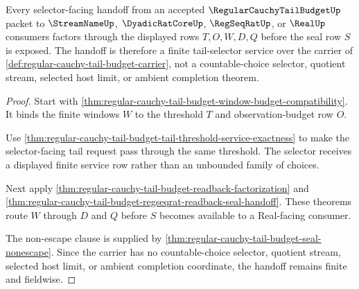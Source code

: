\begin{theorem}
\label{thm:regular-cauchy-tail-budget-tail-selector-handoff}
Every selector-facing handoff from an accepted $\RegularCauchyTailBudgetUp$ packet to $\StreamNameUp$, $\DyadicRatCoreUp$, $\RegSeqRatUp$, or $\RealUp$ consumers factors through the displayed rows $T,O,W,D,Q$ before the seal row $S$ is exposed. The handoff is therefore a finite tail-selector service over the carrier of \autoref{def:regular-cauchy-tail-budget-carrier}, not a countable-choice selector, quotient stream, selected host limit, or ambient completion theorem.
\end{theorem}
\begin{proof}
Start with \autoref{thm:regular-cauchy-tail-budget-window-budget-compatibility}. It binds the finite windows $W$ to the threshold $T$ and observation-budget row $O$.

Use \autoref{thm:regular-cauchy-tail-budget-tail-threshold-service-exactness} to make the selector-facing tail request pass through the same threshold. The selector receives a displayed finite service row rather than an unbounded family of choices.

Next apply \autoref{thm:regular-cauchy-tail-budget-readback-factorization} and \autoref{thm:regular-cauchy-tail-budget-regseqrat-readback-seal-handoff}. These theorems route $W$ through $D$ and $Q$ before $S$ becomes available to a Real-facing consumer.

The non-escape clause is supplied by \autoref{thm:regular-cauchy-tail-budget-seal-nonescape}. Since the carrier has no countable-choice selector, quotient stream, selected host limit, or ambient completion coordinate, the handoff remains finite and fieldwise.
\end{proof}

